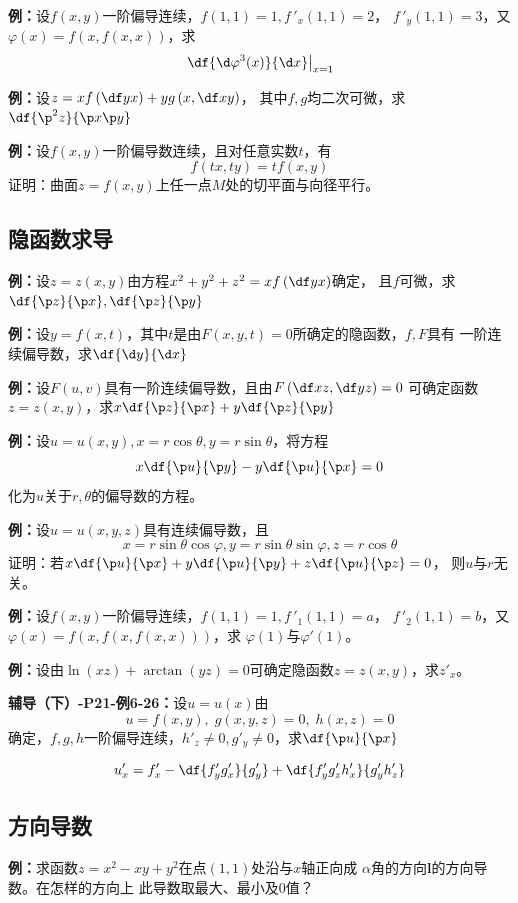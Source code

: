 {\bf 例：}设$f(x,y)$一阶偏导连续，$f(1,1)=1,f\,'_x(1,1)=2$，
$f\,'_y(1,1)=3$，又$\varphi(x)=f(x,f(x,x))$，求
$$\left.\df{\d\varphi^3(x)}{\d x}\right|_{x=1}$$

{\bf 例：}设$z=xf\left(\df yx\right)+yg\left(x,\df xy\right)$，
其中$f,g$均二次可微，求$\df{\p^2 z}{\p x\p y}$

{\bf 例：}设$f(x,y)$一阶偏导数连续，且对任意实数$t$，有
$$f(tx,ty)=tf(x,y)$$
证明：曲面$z=f(x,y)$上任一点$M$处的切平面与向径平行。

\subsection*{隐函数求导}

{\bf 例：}设$z=z(x,y)$由方程$x^2+y^2+z^2=xf\left(\df yx\right)$确定，
且$f$可微，求$\df {\p z}{\p x},\df{\p z}{\p y}$

{\bf 例：}设$y=f(x,t)$，其中$t$是由$F(x,y,t)=0$所确定的隐函数，$f,F$具有
一阶连续偏导数，求$\df{\d y}{\d x}$

{\bf 例：}设$F(u,v)$具有一阶连续偏导数，且由$F\left(\df xz,\df yz\right)=0$
可确定函数$z=z(x,y)$，求$x\df{\p z}{\p x}+y\df{\p z}{\p y}$

{\bf 例：}设$u=u(x,y),x=r\cos\theta,y=r\sin\theta$，将方程
$$x\df{\p u}{\p y}-y\df{\p u}{\p x}=0$$
化为$u$关于$r,\theta$的偏导数的方程。

{\bf 例：}设$u=u(x,y,z)$具有连续偏导数，且
$$x=r\sin\theta\cos\varphi,y=r\sin\theta\sin\varphi,z=r\cos\theta$$
证明：若$x\df{\p u}{\p x}+y\df{\p u}{\p y}+z\df{\p u}{\p z}=0$，
则$u$与$r$无关。

{\bf 例：}设$f(x,y)$一阶偏导连续，$f(1,1)=1,f\,'_1(1,1)=a$，
$f\,'_2(1,1)=b$，又$\varphi(x)=f(x,f(x,f(x,x)))$，求
$\varphi(1)$与$\varphi'(1)$。

{\bf 例：}设由$\ln(xz)+\arctan(yz)=0$可确定隐函数$z=z(x,y)$，求$z'_x$。

{\bf 辅导（下）-P21-例6-26：}设$u=u(x)$由
$$u=f(x,y),\;g(x,y,z)=0,\;h(x,z)=0$$
确定，$f,g,h$一阶偏导连续，$h'_z\ne0,g'_y\ne0$，求$\df{\p u}{\p x}$

$$u'_x=f'_x-\df{f'_yg'_x}{g'_y}+\df{f'_yg'_zh'_x}{g'_yh'_z}$$

\subsection*{方向导数}

{\bf 例：}求函数$z=x^2-xy+y^2$在点$(1,1)$处沿与$x$轴正向成
$\alpha$角的方向$\bm{l}$的方向导数。在怎样的方向上
此导数取最大、最小及$0$值？

